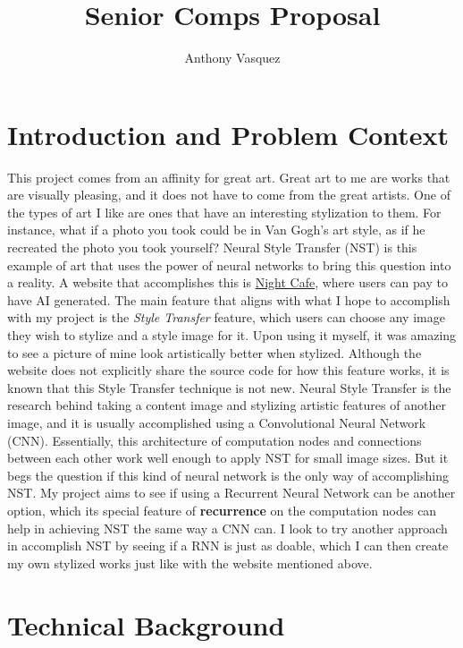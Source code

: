 \documentclass[10pt,twocolumn]{article}
\title{Senior Comps Proposal}
\author{Anthony Vasquez}
\begin{document}
\maketitle

\section{Introduction and Problem Context}
This project comes from an affinity for great art. Great art to me are works that are visually pleasing, and it does not have to come from the great artists. One of the types of art I like are ones that have an interesting stylization to them. For instance, what if a photo you took could be in Van Gogh's art style, as if he recreated the photo you took yourself? Neural Style Transfer (NST) is this example of art that uses the power of neural networks to bring this question into a reality. A website that accomplishes this is \href{https://creator.nightcafe.studio/}{Night Cafe}, where users can pay to have AI generated. The main feature that aligns with what I hope to accomplish with my project is the \textit{Style Transfer} feature, which users can choose any image they wish to stylize and a style image for it. Upon using it myself, it was amazing to see a picture of mine look artistically better when stylized. Although the website does not explicitly share the source code for how this feature works, it is known that this Style Transfer technique is not new. Neural Style Transfer is the research behind taking a content image and stylizing artistic features of another image, and it is usually accomplished using a Convolutional Neural Network (CNN). Essentially, this architecture of computation nodes and connections between each other work well enough to apply NST for small image sizes. But it begs the question if this kind of neural network is the only way of accomplishing NST. My project aims to see if using a Recurrent Neural Network can be another option, which its special feature of \textbf{recurrence} on the computation nodes can help in achieving NST the same way a CNN can. I look to try another approach in accomplish NST by seeing if a RNN is just as doable, which I can then create my own stylized works just like with the website mentioned above.

\section{Technical Background}
\end{document}
